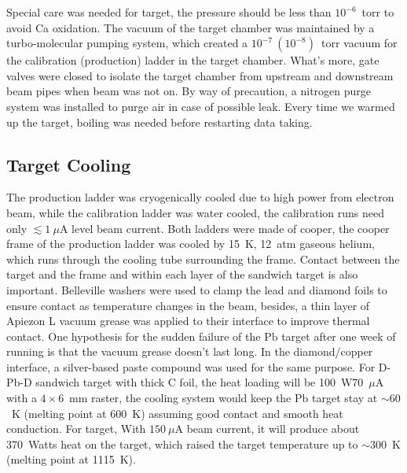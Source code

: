 Special care was needed for \Ca target, the pressure should be less than $10^{-6}$~torr
to avoid Ca oxidation. The vacuum of the target chamber was maintained by a 
turbo-molecular pumping system, which created a $10^{-7}\ (10^{-8})$~torr vacuum 
for the calibration (production) ladder in the target chamber. What's more,
gate valves were closed to isolate the target chamber from upstream and downstream
beam pipes when beam was not on. By way of precaution, a nitrogen purge system 
was installed to purge air in case of possible leak.
Every time we warmed up the \Ca target, boiling was needed before restarting data taking.

\subsection{Target Cooling}
The production ladder was cryogenically cooled due to high power from electron beam,
while the calibration ladder was water cooled, the calibration runs need only
$\lesssim 1\ \mu$A level beam current. Both ladders were made of cooper,
the cooper frame of the production ladder was cooled by 15~K, 12~atm gaseous helium, 
which runs through the cooling tube surrounding the frame.
Contact between the target and the frame and within each layer of the \Pb sandwich
target is also important. Belleville washers were used to clamp the lead and 
diamond foils to ensure contact as temperature changes in the beam, besides, 
a thin layer of Apiezon L vacuum grease was applied to their interface to improve 
thermal contact. One hypothesis for the sudden failure of the Pb target after
one week of running is that the vacuum grease doesn't last long.
In the diamond/copper interface, a silver-based paste compound was used for the same purpose.
For D-Pb-D sandwich target with thick C foil, the heat loading will be 100~W\@70~$\mu$A
with a $4\times 6$~mm raster, the cooling system would keep the Pb target stay at
$\sim60$~K (melting point at $600$~K) assuming good contact and smooth heat
conduction. For \Ca target, With $150\ \mu$A beam current, 
it will produce about 370~Watts heat on the target, which raised the target temperature 
up to $\sim300$~K (melting point at 1115~K).


